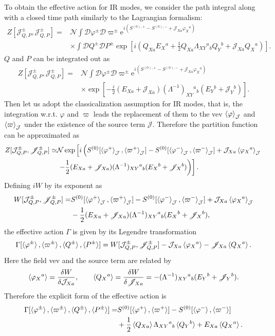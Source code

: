 \documentclass[aps, prd
, preprint
, nofootinbib 
]{revtex4-1}
\newcommand{\var}[2]{\frac{\delta #1}{\delta #2}}
\newcommand{\ee}{\mathrm{e}}
\newcommand{\calJ}{\mathcal{J}}
\newcommand{\scrJ}{\mathscr{J}}
\newcommand{\calN}{\mathcal{N}}
\newcommand{\scrD}{\mathscr{D}}
\newcommand{\bae}[1]{\begin{align} #1 \end{align}}
\begin{document}
To obtain the effective action for IR modes, we consider the path integral along with a closed time path similarly to the Lagrangian formalism:
\bae{
	Z[\calJ^\pm_{Q,P},\scrJ^\pm_{Q,P}]=&\calN\int\scrD\varphi^\pm\scrD\varpi^\pm\ee^{i\left(S^{(0),+}-S^{(0),-}+\calJ_{Xa}\varphi_X{}^a\right)} 
	\nonumber \\
	&\times\int\scrD Q^\pm\scrD P^\pm\exp\left[i\left(Q_{Xa}E_X{}^a+\frac{1}{2}Q_{Xa}\Lambda_{XY}{}^a{}_bQ_Y{}^b+\scrJ_{Xa}Q_X{}^a\right)\right].
}
$Q$ and $P$ can be integrated out as
\bae{
	Z[\calJ_{Q,P}^\pm,\scrJ_{Q,P}^\pm]=&\calN\int\scrD\varphi^\pm\scrD\varpi^\pm\ee^{i\left(S^{(0),+}-S^{(0),-}+\calJ_{Xa}\varphi_X{}^a\right)} 
	\nonumber \\
	&\times\exp\left[-\frac{i}{2}(E_{Xa}+\scrJ_{Xa})(\Lambda^{-1})_{XY}{}^a{}_b(E_Y{}^b+\scrJ_Y{}^b)\right].
}
Then let us adopt the classicalization assumption for IR modes, that is, the integration w.r.t. $\varphi$ and $\varpi$ leads
the replacement of them to the vev $\braket{\varphi}_\calJ$ and $\braket{\varpi}_\calJ$ under the existence of the source term $\calJ$.
Therefore the partition function can be approximated as
\bae{\label{eq: Z in Hamiltonian}
	Z[\calJ^\pm_{Q,P},\scrJ^\pm_{Q,P}]\simeq&\calN\exp\left[i\left(S^{(0)}[\braket{\varphi^+}_\calJ,\braket{\varpi^+}_\calJ]
	-S^{(0)}[\braket{\varphi^-}_\calJ,\braket{\varpi^-}_\calJ]+\calJ_{Xa}\braket{\varphi_X{}^a}_\calJ \right.\right.\nonumber \\
	&\left.\left.-\frac{1}{2}(E_{Xa}+\scrJ_{Xa})(\Lambda^{-1})_{XY}{}^a{}_b(E_X{}^b+\scrJ_X{}^b)\right)\right].
}
Defining $iW$ by its exponent as
\bae{
	W[\calJ^\pm_{Q,P},\scrJ^\pm_{Q,P}]=&S^{(0)}[\braket{\varphi^+}_\calJ,\braket{\varpi^+}_\calJ]
	-S^{(0)}[\braket{\varphi^-}_\calJ,\braket{\varpi^-}_\calJ]+\calJ_{Xa}\braket{\varphi_X{}^a}_\calJ \nonumber \\
	&-\frac{1}{2}(E_{Xa}+\scrJ_{Xa})(\Lambda^{-1})_{XY}{}^a{}_b(E_X{}^b+\scrJ_X{}^b),
}
the effective action $\Gamma$ is given by its Legendre transformation
\bae{
	\Gamma[\braket{\varphi^\pm},\braket{\varpi^\pm},\braket{Q^\pm},\braket{P^\pm}]=W[\calJ^\pm_{Q,P},\scrJ^\pm_{Q,P}]
	-\calJ_{Xa}\braket{\varphi_X{}^a}-\scrJ_{Xa}\braket{Q_X{}^a}.
}
Here the field vev and the source term are related by
\bae{
	\braket{\varphi_X{}^a}=\var{W}{\calJ_{Xa}}, \quad\quad \braket{Q_X{}^a}=\var{W}{\scrJ_{Xa}}
	=-(\Lambda^{-1})_{XY}{}^a{}_b(E_Y{}^b+\scrJ_Y{}^b).
}
Therefore the explicit form of the effective action is
\bae{
	\Gamma[\braket{\varphi^\pm},\braket{\varpi^\pm},\braket{Q^\pm},\braket{P^\pm}]=&S^{(0)}[\braket{\varphi^+},\braket{\varpi^+}]
	-S^{(0)}[\braket{\varphi^-},\braket{\varpi^-}] \nonumber \\
	&+\frac{1}{2}\braket{Q_{Xa}}\Lambda_{XY}{}^a{}_b\braket{Q_Y{}^b}+E_{Xa}\braket{Q_X{}^a}.
}
\end{document}
